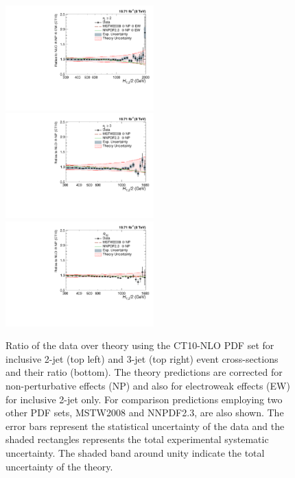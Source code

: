 \begin{figure}[!ht]
 \begin{center}
 \hspace*{-5mm}\includegraphics[width=0.51\textwidth]{Plots_HT_2_150/Comparison_data_NLO_Pdfs_2_EW.pdf}%
 ~~\includegraphics[width=0.51\textwidth]{Plots_HT_2_150/Comparison_data_NLO_Pdfs_3.pdf}\\
 \includegraphics[width=0.51\textwidth]{Plots_HT_2_150/Comparison_data_NLO_Pdfs_ratio_32.pdf}\\
 \caption[Ratio of the data over theory using the CT10-NLO PDF set.]{Ratio of the data over theory using the CT10-NLO PDF set for inclusive 2-jet (top left) and 3-jet (top right) event cross-sections and their ratio \ratio (bottom). The theory predictions are corrected for non-perturbative effects (NP) and also for electroweak effects (EW) for inclusive 2-jet only. For comparison predictions employing two other PDF sets, MSTW2008 and NNPDF2.3, are also shown. The error bars represent the statistical uncertainty of the data and the shaded rectangles represents the total experimental systematic uncertainty. The shaded band around unity indicate the total uncertainty of the theory.}
 \label{fig:data_NLOPdfs}
 \end{center}
\end{figure}

